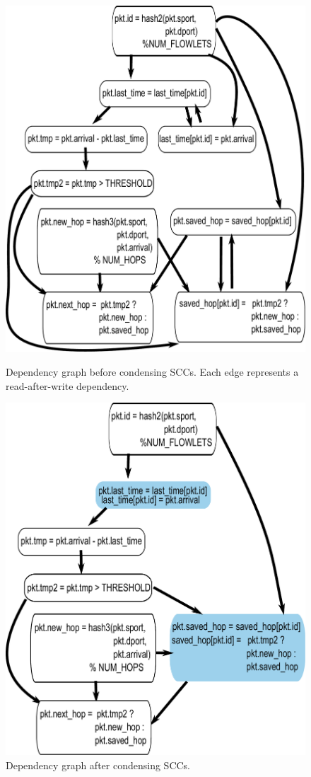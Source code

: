\begin{figure}[!t]
\begin{minipage}{0.5\textwidth}
  \includegraphics[width=0.8\columnwidth]{deps.pdf}
  \caption{Dependency graph before condensing SCCs. Each edge represents
  a read-after-write dependency.}
  \label{fig:partitioning_before}
\end{minipage}
\begin{minipage}{0.5\textwidth}
\includegraphics[width=0.8\columnwidth]{scc.pdf}
\caption{Dependency graph after condensing SCCs.}
\label{fig:partitioning_after}
\end{minipage}
\end{figure}

